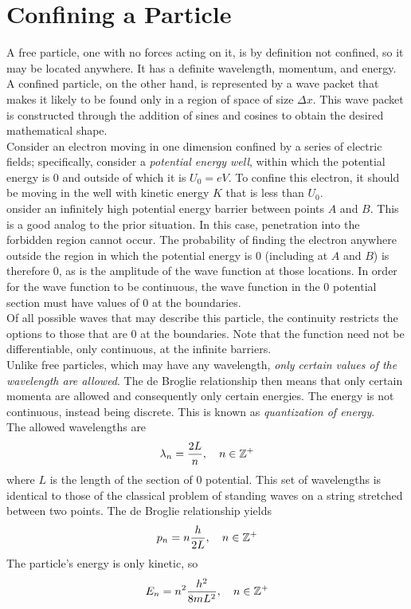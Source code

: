 \documentclass{subfiles}
\begin{document}
	\setcounter{section}{1}
	\section{Confining a Particle}
		A free particle, one with no forces acting on it, is by definition not confined, so it may be located anywhere. It has a definite wavelength, momentum, and energy. A confined particle, on the other hand, is represented by a wave packet that makes it likely to be found only in a region of space of size \(\Delta x\). This wave packet is constructed through the addition of sines and cosines to obtain the desired mathematical shape. \\
		Consider an electron moving in one dimension confined by a series of electric fields; specifically, consider a \textit{potential energy well}, within which the potential energy is 0 and outside of which it is \(U_0 = eV\). To confine this electron, it should be moving in the well with kinetic energy \(K\) that is less than \(U_0\). \\
			onsider an infinitely high potential energy barrier between points \(A\) and \(B\). This is a good analog to the prior situation. In this case, penetration into the forbidden region cannot occur. The probability of finding the electron anywhere outside the region in which the potential energy is 0 (including at \(A\) and \(B\)) is therefore 0, as is the amplitude of the wave function at those locations. In order for the wave function to be continuous, the wave function in the 0 potential section must have values of 0 at the boundaries. \\
			Of all possible waves that may describe this particle, the continuity restricts the options to those that are 0 at the boundaries. Note that the function need not be differentiable, only continuous, at the infinite barriers. \\
		Unlike free particles, which may have any wavelength, \textit{only certain values of the wavelength are allowed}. The de Broglie relationship then means that only certain momenta are allowed and consequently only certain energies. The energy is not continuous, instead being discrete. This is known as \textit{quantization of energy}. \\
			The allowed wavelengths are
			\[
				\lambda_n = \frac{2L}{n} 
					, \quad n \in \mathbb{Z}^+
			\]
			where \(L\) is the length of the section of 0 potential. This set of wavelengths is identical to those of the classical problem of standing waves on a string stretched between two points. The de Broglie relationship yields
			\[
				p_n = n\frac{h}{2L} 
					, \quad n \in \mathbb{Z}^+
			\]
			The particle's energy is only kinetic, so
			\[
				E_n = n^2\frac{h^2}{8mL^2} 
					, \quad n \in \mathbb{Z}^+
			\]
\end{document}
